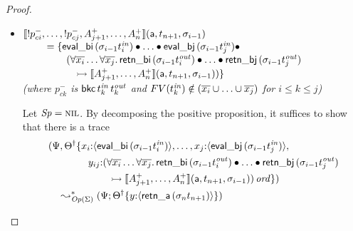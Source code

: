 \begin{proof}
\begin{itemize}
\item $\llbracket {{!}p^-_{ci},\ldots,{!}p^-_{cj},A^+_{j+1},\ldots,A^+_n} \rrbracket({\sf a},{t_{n+1}},{\sigma_{i-1}})$
  \\
  $~ \qquad = \{ {\sf eval\_bi}\,({\sigma_{i-1}}t^{\it in}_i) 
                    \mathbin{\bullet}  \ldots \mathbin{\bullet}
                 {\sf eval\_bj}\,({\sigma_{i-1}}t^{\it in}_j) \mathbin{\bullet} ~$
  \\
  $~ \qquad \qquad (\forall\overline{x_i}\ldots\forall\overline{x_j}.\, 
     {\sf retn\_bi}\,(\sigma_{i-1}{t^{\it out}_i})
     \mathbin{\bullet} \ldots \mathbin{\bullet} 
     {\sf retn\_bj}\,(\sigma_{i-1}{t^{\it out}_j})$
  \\
  $~ \qquad \qquad \quad
   \rightarrowtail \llbracket {A^+_{j+1},\ldots,A^+_n} \rrbracket({\sf a},{t_{n+1}},{\sigma_{i-1}})) \}$\\
  {\it (where
   $p^-_{ck}$ is ${\sf bkc}\,t^{\it in}_k\,t^{\it out}_k$ 
   and $FV(t_k^{\it in}) \notin (\overline{x_i} \cup \ldots \cup \overline{x_j})$ 
   for $i \leq k \leq j$)}

  \bigskip
  Let ${\it Sp} = \textsc{nil}$. By decomposing the positive proposition, it 
  suffices to show that there is a trace
\begin{align*}
    &(\Psi, {{\Theta}^\dag} \{
        x_i{:}\langle {{\sf eval\_bi}\,({\sigma_{i-1}}t^{\it in}_i)} \rangle, \ldots,
    x_j{:}\langle {{\sf eval\_bj}\,({\sigma_{i-1}}t^{\it in}_j)} \rangle,
  \\
  & \qquad\qquad y_{ij}{:}(\forall\overline{x_i}\ldots\forall\overline{x_j}.\, 
     {\sf retn\_bi}\,(\sigma_{i-1}{t^{\it out}_i})
     \mathbin{\bullet} \ldots \mathbin{\bullet} 
     {\sf retn\_bj}\,(\sigma_{i-1}{t^{\it out}_j})\\
  & \qquad\qquad\qquad
      \rightarrowtail \llbracket {A^+_{j+1},\ldots,A^+_n} \rrbracket({\sf a},{t_{n+1}},{\sigma_{i-1}}))\,{\it ord}
       \})
  \\
  & \quad \leadsto^*_{{\it Op}({\Sigma})} 
     (\Psi; {{{\Theta}^\dag}}\{{y{:}\langle {{\sf retn\_a}\,({\sigma_n}t_{n+1})} \rangle}\})
\end{align*}


\end{itemize}
\end{proof}
